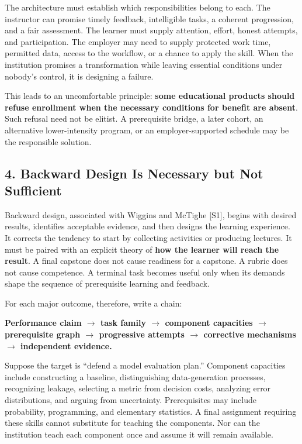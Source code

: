 The architecture must establish which responsibilities belong to each. The instructor can promise timely feedback, intelligible tasks, a coherent progression, and a fair assessment. The learner must supply attention, effort, honest attempts, and participation. The employer may need to supply protected work time, permitted data, access to the workflow, or a chance to apply the skill. When the institution promises a transformation while leaving essential conditions under nobody's control, it is designing a failure.

This leads to an uncomfortable principle: \textbf{some educational products should refuse enrollment when the necessary conditions for benefit are absent}. Such refusal need not be elitist. A prerequisite bridge, a later cohort, an alternative lower-intensity program, or an employer-supported schedule may be the responsible solution.

\subsection*{4. Backward Design Is Necessary but Not Sufficient}

Backward design, associated with Wiggins and McTighe [S1], begins with desired results, identifies acceptable evidence, and then designs the learning experience. It corrects the tendency to start by collecting activities or producing lectures. It must be paired with an explicit theory of \textbf{how the learner will reach the result}. A final capstone does not cause readiness for a capstone. A rubric does not cause competence. A terminal task becomes useful only when its demands shape the sequence of prerequisite learning and feedback.

For each major outcome, therefore, write a chain:
\begin{center}
\textbf{Performance claim $\to$ task family $\to$ component capacities $\to$ prerequisite graph $\to$ progressive attempts $\to$ corrective mechanisms $\to$ independent evidence.}
\end{center}

Suppose the target is ``defend a model evaluation plan.'' Component capacities include constructing a baseline, distinguishing data-generation processes, recognizing leakage, selecting a metric from decision costs, analyzing error distributions, and arguing from uncertainty. Prerequisites may include probability, programming, and elementary statistics. A final assignment requiring these skills cannot substitute for teaching the components. Nor can the institution teach each component once and assume it will remain available.

